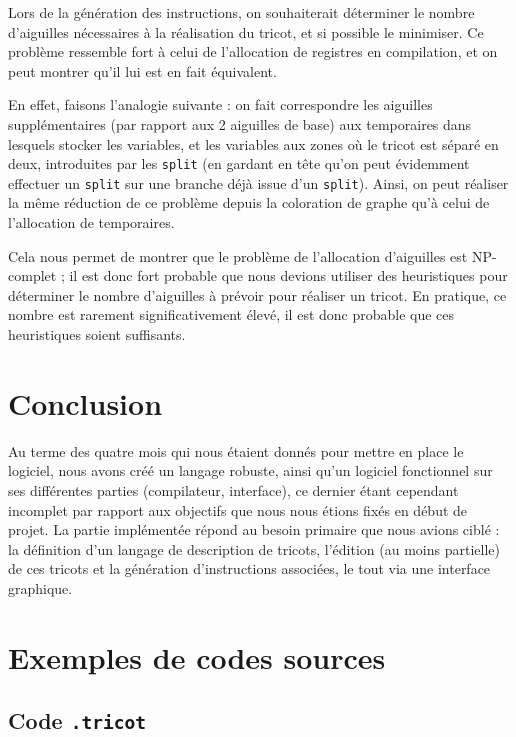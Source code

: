 \documentclass{article}
\begin{document}
Lors de la génération des instructions, on souhaiterait déterminer le nombre d'aiguilles nécessaires à la réalisation du tricot, 
et si possible le minimiser. Ce problème ressemble fort à celui de l'allocation de registres en compilation, et on peut montrer 
qu'il lui est en fait équivalent.

En effet, faisons l'analogie suivante : on fait correspondre les aiguilles supplémentaires (par rapport aux 2 aiguilles de base) 
aux temporaires dans lesquels stocker les variables, et les variables aux zones où le tricot est séparé en deux, introduites par 
les \texttt{split} (en gardant en tête qu'on peut évidemment effectuer un \texttt{split} sur une branche déjà issue d'un 
\texttt{split}). Ainsi, on peut réaliser la même réduction de ce problème depuis la coloration de graphe qu'à celui de l'allocation 
de temporaires.

Cela nous permet de montrer que le problème de l'allocation d'aiguilles est \textsc{NP}-complet ; il est donc fort probable 
que nous devions utiliser des heuristiques pour déterminer le nombre d'aiguilles à prévoir pour réaliser un tricot. En pratique,
ce nombre est rarement significativement élevé, il est donc probable que ces heuristiques soient suffisants.

\section*{Conclusion}

Au terme des quatre mois qui nous étaient donnés pour mettre en place le logiciel, nous avons créé un langage robuste, ainsi qu'un 
logiciel fonctionnel sur ses différentes parties (compilateur, interface), ce dernier étant cependant incomplet par rapport aux 
objectifs que nous nous étions fixés en début de projet. La partie implémentée répond au besoin primaire que nous avions ciblé : 
la définition d'un langage de description de tricots, l'édition (au moins partielle) de ces tricots et 
la génération d'instructions associées, le tout via une interface graphique.

\newpage

\appendix

\section{Exemples de codes sources}

\subsection{Code \texttt{.tricot}}
\end{document}

